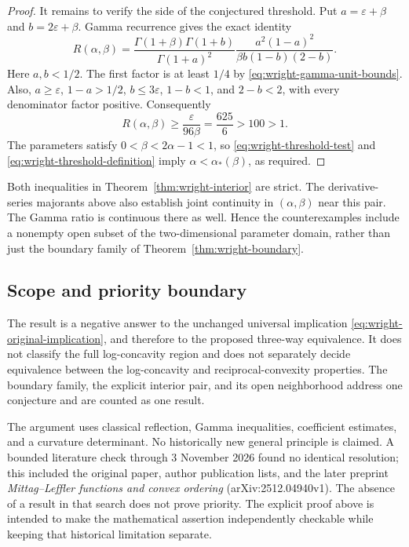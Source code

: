 \documentclass[11pt,a4paper]{article}
\theoremstyle{definition}
\theoremstyle{remark}
\numberwithin{equation}{section}
\begin{document}
\begin{proof}
It remains to verify the side of the conjectured threshold. Put
$a=\varepsilon+\beta$ and $b=2\varepsilon+\beta$. Gamma recurrence
gives the exact identity
\begin{equation}
 R(\alpha,\beta)
 =\frac{\Gamma(1+\beta)\Gamma(1+b)}{\Gamma(1+a)^2}
   \frac{a^2(1-a)^2}{\beta b(1-b)(2-b)}.
 \label{eq:wright-positive-ratio}
\end{equation}
Here $a,b<1/2$. The first factor is at least $1/4$ by
\eqref{eq:wright-gamma-unit-bounds}. Also,
$a\geq\varepsilon$, $1-a>1/2$, $b\leq3\varepsilon$,
$1-b<1$, and $2-b<2$, with every denominator factor positive.
Consequently
\[
 R(\alpha,\beta)\geq\frac{\varepsilon}{96\beta}
 =\frac{625}{6}>100>1.
\]
The parameters satisfy $0<\beta<2\alpha-1<1$, so
\eqref{eq:wright-threshold-test} and
\eqref{eq:wright-threshold-definition} imply
$\alpha<\alpha_*(\beta)$, as required.
\end{proof}

Both inequalities in Theorem~\ref{thm:wright-interior} are strict.
The derivative-series majorants above also establish joint continuity
in $(\alpha,\beta)$ near this pair. The Gamma ratio is continuous
there as well. Hence the counterexamples include a nonempty open
subset of the two-dimensional parameter domain, rather than just the
boundary family of Theorem~\ref{thm:wright-boundary}.

\subsection{Scope and priority boundary}

The result is a negative answer to the unchanged universal implication
\eqref{eq:wright-original-implication}, and therefore to the proposed
three-way equivalence. It does not classify the full log-concavity
region and does not separately decide equivalence between the
log-concavity and reciprocal-convexity properties. The boundary
family, the explicit interior pair, and its open neighborhood address
one conjecture and are counted as one result.

The argument uses classical reflection, Gamma inequalities,
coefficient estimates, and a curvature determinant. No historically
new general principle is claimed. A bounded literature check through
3 November 2026 found no identical resolution; this included the
original paper, author publication lists, and the later preprint
\emph{Mittag--Leffler functions and convex ordering}
(arXiv:2512.04940v1). The absence of a result in that search does not
prove priority. The explicit proof above is intended to make the
mathematical assertion independently checkable while keeping that
historical limitation separate.
\end{document}
